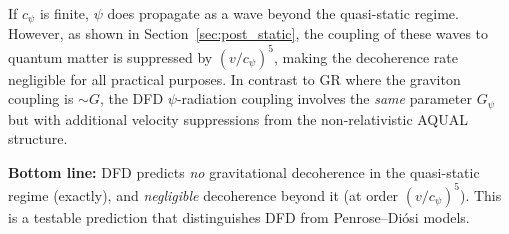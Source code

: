 \documentclass[12pt,a4paper]{article}
\theoremstyle{definition}
\theoremstyle{remark}
\begin{document}
If $c_\psi$ is finite, $\psi$ does propagate as a wave beyond the quasi-static
regime.  However, as shown in Section~\ref{sec:post_static}, the coupling of
these waves to quantum matter is suppressed by $(v/c_\psi)^5$, making the
decoherence rate negligible for all practical purposes.  In contrast to GR
where the graviton coupling is $\sim G$, the DFD $\psi$-radiation coupling
involves the \emph{same} parameter $G_\psi$ but with additional velocity
suppressions from the non-relativistic AQUAL structure.

\textbf{Bottom line:}  DFD predicts \emph{no} gravitational decoherence in the
quasi-static regime (exactly), and \emph{negligible} decoherence beyond it
(at order $(v/c_\psi)^5$).  This is a testable prediction that distinguishes
DFD from Penrose--Di\'osi models.
\end{document}
